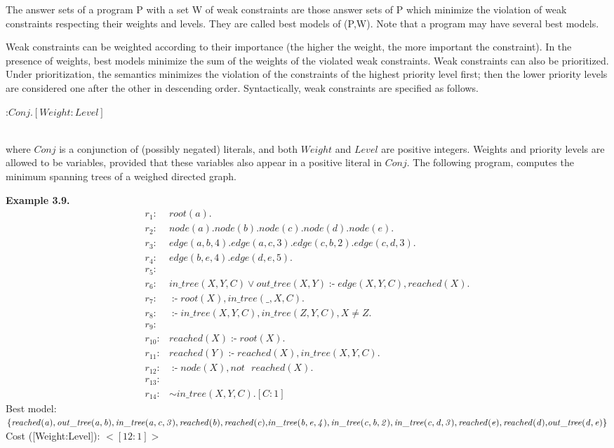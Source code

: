 \documentclass[14pt,a4paper, titlepage]{article}
\DeclareMathOperator{\leftimpl}{:-}
\begin{document}
The answer sets of a program P with a set W of weak constraints are those answer sets of P which minimize the violation of weak constraints respecting their weights and levels. They are called best models of (P,W). Note that a program may have several best models.


Weak constraints can be weighted according to their importance (the higher the weight, the more important the constraint). In the presence of weights, best models minimize the sum of the weights of the violated weak constraints. Weak constraints can also be prioritized. Under prioritization, the semantics minimizes the violation of the constraints of the highest priority level first; then the lower priority levels are considered one after the other in descending order. Syntactically, weak constraints are specified as follows. \\ \centerline{:$\mathit{Conj}. [\mathit{Weight}:\mathit{Level}]$} \\ where $\mathit{Conj}$ is a conjunction of (possibly negated) literals, and both $\mathit{Weight}$ and $\mathit{Level}$ are positive integers. Weights and priority levels are allowed to be variables, provided that these variables also appear in a positive literal in $\mathit{Conj}$.
The following program, computes the minimum spanning trees of a weighed directed graph.

\textbf{Example 3.9.}
\begin{align*}
r_1\colon& \mathit{root}(a). \\
r_2\colon& \mathit{node}(a). \mathit{node}(b). \mathit{node}(c). \mathit{node}(d). \mathit{node}(e). \\
r_3\colon& \mathit{edge}(a,b,4). \mathit{edge}(a,c,3). \mathit{edge}(c,b,2). \mathit{edge}(c,d,3). \\
r_4\colon& \mathit{edge}(b,e,4). \mathit{edge}(d,e,5). \\
r_5\colon& \\
r_6 \colon & \mathit{in\_tree}(X,Y,C) \vee \mathit{out\_tree}(X,Y) \leftimpl \mathit{edge}(X,Y,C), \mathit{reached}(X). \\
r_7\colon& \leftimpl \mathit{root}(X), \mathit{in\_tree}(\_,X,C).\\
r_8\colon& \leftimpl \mathit{in\_tree}(X,Y,C), \mathit{in\_tree}(Z,Y,C), X \neq Z. \\
r_9\colon&  \\
r_{10}\colon& \mathit{reached}(X) \leftimpl \mathit{root}(X). \\
r_{11}\colon& \mathit{reached}(Y) \leftimpl \mathit{reached}(X), \mathit{in\_tree}(X,Y,C). \\
r_{12}\colon& \leftimpl \mathit{node}(X), \mathit{not} \text{ } \mathit{reached}(X). \\
r_{13}\colon&   \\
r_{14}\colon&\mathit{ \sim in\_tree}(X,Y,C). [C:1]
\end{align*}
Best model: $\mathit{\{reached(a), out\_tree(a,b), in\_tree(a,c,3), reached(b), reached(c),}\\ \mathit{ in\_tree(b,e,4), in\_tree(c,b,2), in\_tree(c,d,3), reached(e), reached(d),} \\ \mathit{  out\_tree(d,e)\}}$
\\Cost ([Weight:Level]): $<[12:1]>$
\end{document}
